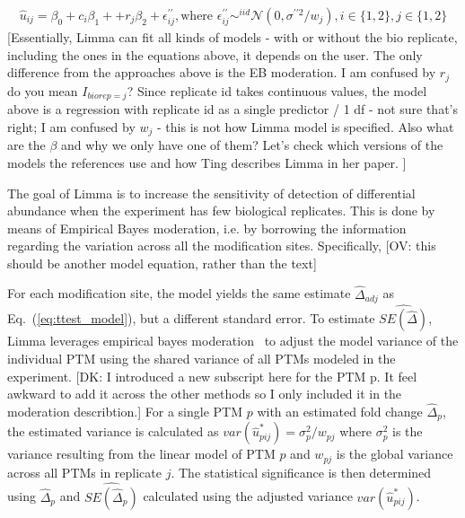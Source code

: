 \documentclass[mcp]{article}
\numberwithin{table}{section}
\def\todo#1{{\color{red}[#1]}}
\def\eqref#1{Eq.~(\ref{eq:#1})}
\begin{document}
\begin{equation}
\begin{aligned}
\hat{u}_{ij} = \beta_0 + c_{i}\beta_1 + + r_j\beta_2 + \epsilon^{\prime\prime}_{ij}, \text{where } \epsilon^{\prime\prime}_{ij} \mathop\sim^{iid} \mathcal{N}(0, \sigma^{\prime\prime 2}/w_j), i \in \{1, 2\}, j \in \{1, 2\}
\end{aligned}
\label{eq:limma_model}
\end{equation}
\todo{Essentially, Limma can fit all kinds of models - with or without the bio replicate, including the ones in the equations above, it depends on the user. The only difference from the approaches above is the EB moderation.  I am confused by $r_j$ do you mean $I_{biorep=j}$? Since replicate id takes continuous values, the model above is a regression with replicate id as a single predictor / 1 df - not sure that's right;  I am confused by $w_j$ - this is not how Limma model is specified. Also what are the $\beta$ and why we only have one of them? Let's check which versions of the models the references use and how Ting describes Limma in her paper. }

The goal of Limma is to increase the sensitivity of detection of differential abundance when the experiment has few biological replicates. This is done by means of Empirical Bayes moderation, i.e. by borrowing the information regarding the variation across all the modification sites. Specifically, \todo{OV: this should be another model equation, rather than the text} 

For each modification site, the model yields the same estimate $\hat{\Delta}_{adj}$ as \eqref{ttest_model}, but a different standard error. To estimate $\widehat{SE(\hat{\Delta})}$, Limma leverages empirical bayes moderation~\cite{Robbins1992} to adjust the model variance of the individual PTM using the shared variance of all PTMs modeled in the experiment. \todo{DK: I introduced a new subscript here for the PTM p. It feel awkward to add it across the other methods so I only included it in the moderation describtion.} For a single PTM $p$ with an estimated fold change $\hat{\Delta}_p$, the estimated variance is calculated as $var(\hat{u}^{\ast}_{pij}) = \sigma^2_p / w_{pj}$ where $\sigma^2_p$ is the variance resulting from the linear model of PTM $p$ and $w_{pj}$ is the global variance across all PTMs in replicate $j$. The statistical significance is then determined using $\hat{\Delta}_p$ and $\widehat{SE(\hat{\Delta}_p)}$ calculated using the adjusted variance $var(\hat{u}^{\ast}_{pij})$.
\end{document}

